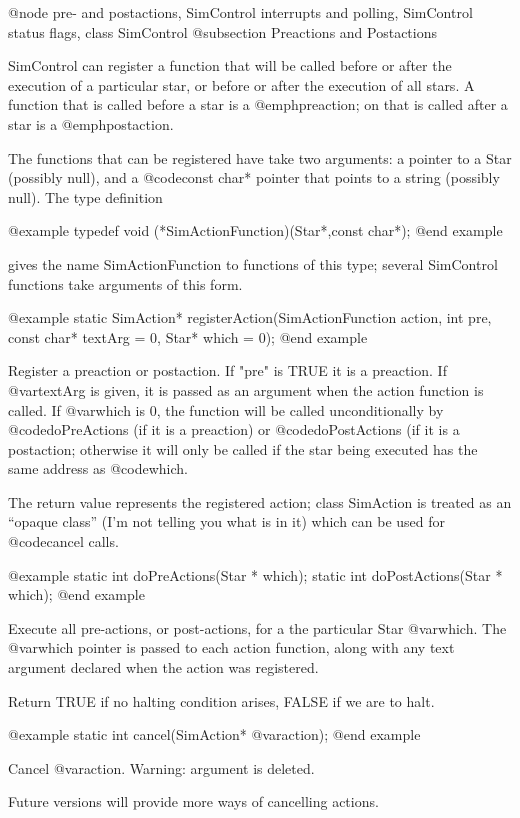 @node pre- and postactions, SimControl interrupts and polling, SimControl status flags, class SimControl
@subsection Preactions and Postactions

SimControl can register a function that will be called before
or after the execution of a particular star, or before or after
the execution of all stars.  A function that is called before
a star is a @emph{preaction}; on that is called after a star is
a @emph{postaction}.

The functions that can be registered have take two arguments: a
pointer to a Star (possibly null), and a @code{const char*} pointer
that points to a string (possibly null).  The type definition

@example
typedef void (*SimActionFunction)(Star*,const char*);
@end example

gives the name SimActionFunction to functions of this type;
several SimControl functions take arguments of this form.

@example
static SimAction* registerAction(SimActionFunction action, int pre,
 const char* textArg = 0, Star* which = 0);
@end example

Register a preaction or postaction.  If "pre" is TRUE it is a preaction.
If @var{textArg} is given, it is passed as an argument when the
action function is called.  If @var{which} is 0, the function will
be called unconditionally by @code{doPreActions} (if it is a preaction)
or @code{doPostActions} (if it is a postaction; otherwise it will
only be called if the star being executed has the same address as
@code{which}.

The return value represents the registered action; class SimAction
is treated as an ``opaque class'' (I'm not telling you what is in it)
which can be used for @code{cancel} calls.

@example
static int doPreActions(Star * which);
static int doPostActions(Star * which);
@end example

Execute all pre-actions, or post-actions, for a the particular Star
@var{which}.  The @var{which} pointer is passed to each action
function, along with any text argument declared when the action
was registered.

Return TRUE if no halting condition arises, FALSE if we are to halt.

@example
static int cancel(SimAction* @var{action});
@end example

Cancel @var{action}.  Warning: argument is deleted.

Future versions will provide more ways of cancelling actions.

